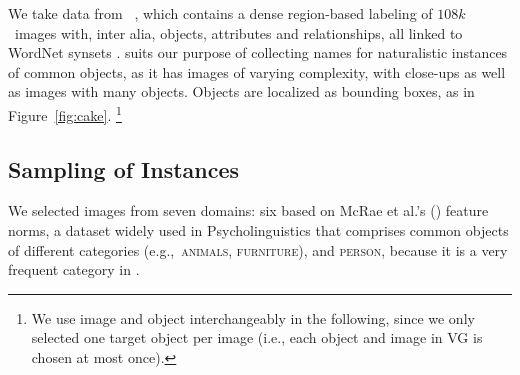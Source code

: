 
We take data from \vg~\cite{krishna2016visualgenome}, which
contains a dense region-based labeling of $108k$~images with, inter alia, objects, attributes and relationships,  %
all linked to WordNet synsets \cite{fellbaum1998wordnet}.
\vg suits our purpose of collecting names for naturalistic instances of common objects, as it has images of varying complexity, with close-ups as well as images with many objects.
Objects are localized as 
 bounding boxes, as in Figure~\ref{fig:cake}.%
\footnote{We use image and object interchangeably in the following, since we only selected one target object per image (i.e., each object and image in VG is chosen at most once).}

\subsection{Sampling of Instances}
\label{ssec:sampling}
We selected images from seven domains: six based on McRae et al.'s  (\citeyear{mcrae2005semantic}) feature norms, a dataset widely used in Psycholinguistics that comprises common objects of different categories (e.g.,~\textsc{animals}, \textsc{furniture}), and \textsc{person}, because it is a very frequent category in \vg.

